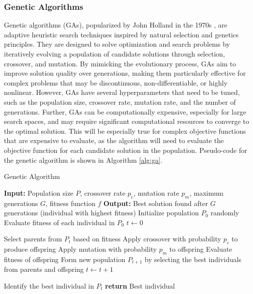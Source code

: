 \documentclass{article}[11pt]
\begin{document}
\subsubsection*{Genetic Algorithms}
Genetic algorithms (GAs), popularized by John Holland in the 1970s \cite{Holland:1975aa}, are adaptive heuristic search techniques inspired by natural selection and genetics principles. 
They are designed to solve optimization and search problems by iteratively evolving a population of candidate solutions through selection, crossover, and mutation. 
By mimicking the evolutionary process, GAs aim to improve solution quality over generations, making them particularly effective for complex problems that may be discontinuous, non-differentiable, or highly nonlinear.
However, GAs have several hyperparameters that need to be tuned, such as the population size, crossover rate, mutation rate, and the number of generations.
Further, GAs can be computationally expensive, especially for large search spaces, and may require significant computational resources to converge to the optimal solution.
This will be especially true for complex objective functions that are expensive to evaluate, as the algorithm will need to evaluate the objective function for each candidate solution in the population.
Pseudo-code for the genetic algorithm is shown in Algorithm \ref{alg:ga}.

\begin{algorithm}[H]
\caption{Genetic Algorithm}\label{alg:ga}
\begin{algorithmic}[1]
\State \textbf{Input:} Population size $P$, crossover rate $p_c$, mutation rate $p_m$, maximum generations $G$, fitness function $f$
\State \textbf{Output:} Best solution found after $G$ generations (individual with highest fitness)
\State Initialize population $P_0$ randomly
\State Evaluate fitness of each individual in $P_0$
\State $t \gets 0$

    \State Select parents from $P_t$ based on fitness
    \State Apply crossover with probability $p_c$ to produce offspring
    \State Apply mutation with probability $p_m$ to offspring
    \State Evaluate fitness of offspring
    \State Form new population $P_{t+1}$ by selecting the best individuals from parents and offspring
    \State $t \gets t + 1$
\EndWhile

\State Identify the best individual in $P_t$
\State \textbf{return} Best individual
\end{algorithmic}
\end{algorithm}
\end{document}
